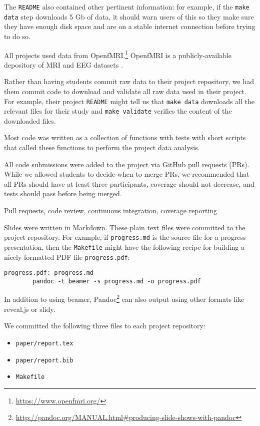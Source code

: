The \texttt{README} also contained other pertinent information:
for example, if the \texttt{make data} step downloads 5 Gb of data, it should
warn users of this so they make sure they have enough disk space and are on a
stable internet connection before trying to do so.
 
All projects used data from OpenfMRI.\footnote{\url{https://www.openfmri.org/}}
OpenfMRI is a publicly-available depository of MRI and EEG datasets
\citep{poldrack2013toward,poldrack2015openfmri}.

Rather than having students commit raw data to their project repository, we had
them commit code to download and validate all raw data used in their project.
For example, their project \texttt{README} might tell us that \texttt{make data}
downloads all the relevant files for their study and \texttt{make validate}
verifies the content of the downloaded files.

Most code was written as a collection of functions with tests with short
scripts that called these functions to perform the project data analysis.

All code submissions were added to the project via GitHub pull requests (PRs).
While we allowed students to decide when to merge PRs, we recommended that
all PRs should have at least three participants, coverage should not decrease,
and tests should pass before being merged.

Pull requests, code review, continuous integration, coverage reporting

Slides were written in Markdown.
These plain text files were committed to the project repository.
For example, if \texttt{progress.md} is the source file for a progress presentation,
then the \texttt{Makefile} might have the following recipe for building a nicely
formatted PDF file \texttt{progress.pdf}:
\begin{verbatim}
progress.pdf: progress.md
        pandoc -t beamer -s progress.md -o progress.pdf
\end{verbatim}

In addition to using beamer,
Pandoc\footnote{\url{http://pandoc.org/MANUAL.html\#producing-slide-shows-with-pandoc}}
can also output using other formats like reveal.js or slidy.

We committed the following three files to each project repository:
\begin{itemize}
\item \texttt{paper/report.tex}
\item \texttt{paper/report.bib}
\item \texttt{Makefile}
\end{itemize}

